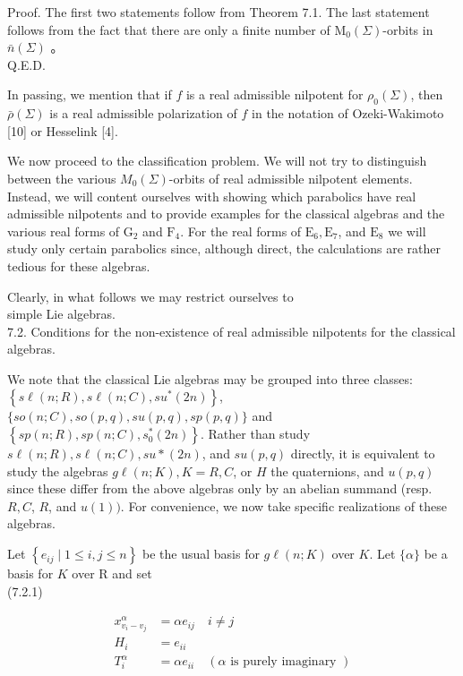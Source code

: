 \documentclass[10pt]{article}
\begin{document}
Proof. The first two statements follow from Theorem 7.1. The last statement follows from the fact that there are only a finite number of $\mathrm{M}_{0}(\Sigma)$-orbits in $\bar{n}(\Sigma)$ 。\\
Q.E.D.

In passing, we mention that if $f$ is a real admissible nilpotent for $\rho_{0}(\Sigma)$, then $\bar{\rho}(\Sigma)$ is a real admissible polarization of $f$ in the notation of Ozeki-Wakimoto [10] or Hesselink [4].

We now proceed to the classification problem. We will not try to distinguish between the various $M_{0}(\Sigma)$-orbits of real admissible nilpotent elements. Instead, we will content ourselves with showing which parabolics have real admissible nilpotents and to provide examples for the classical algebras and the various real forms of $\mathrm{G}_{2}$ and $\mathrm{F}_{4}$. For the real forms of $\mathrm{E}_{6}, \mathrm{E}_{7}$, and $\mathrm{E}_{8}$ we will study only certain parabolics since, although direct, the calculations are rather tedious for these algebras.

Clearly, in what follows we may restrict ourselves to\\
simple Lie algebras.\\
7.2. Conditions for the non-existence of real admissible nilpotents for the classical algebras.

We note that the classical Lie algebras may be grouped into three classes: $\left\{s \ell(n ; R), s \ell(n ; C), s u^{*}(2 n)\right\}$, $\{s o(n ; C), s o(p, q), s u(p, q), s p(p, q)\}$ and $\left\{s p(n ; R), s p(n ; C), s_{0}^{*}(2 n)\right\}$. Rather than study $s \ell(n ; R), s \ell(n ; C), s u *(2 n)$, and $s u(p, q)$ directly, it is equivalent to study the algebras $g \ell(n ; K), K=R, C$, or $H$ the quaternions, and $u(p, q)$ since these differ from the above algebras only by an abelian summand (resp. $R, C$, $R$, and $u(1))$. For convenience, we now take specific realizations of these algebras.

Let $\left\{e_{i j} \mid 1 \leq i, j \leq n\right\}$ be the usual basis for $g \ell(n ; K)$ over $K$. Let $\{\alpha\}$ be a basis for $K$ over R and set\\
(7.2.1)

$$
\begin{aligned}
x_{v_{i}-v_{j}}^{\alpha} & =\alpha e_{i j} \quad i \neq j \\
H_{i} & =e_{i i} \\
T_{i}^{\alpha} \quad & =\alpha e_{i i} \quad(\alpha \text { is purely imaginary })
\end{aligned}
$$
\end{document}
